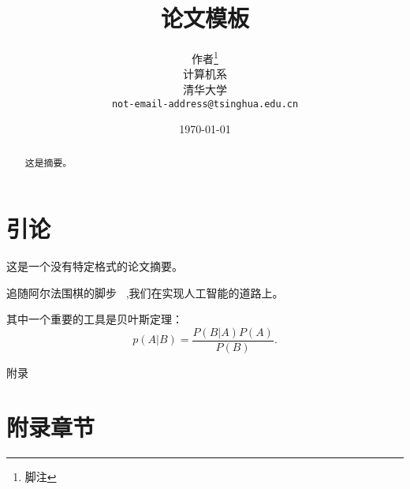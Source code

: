\documentclass[11pt]{article}
\begin{document}
\title{论文模板}
\author{作者\thanks{脚注} \\
  计算机系\\
  清华大学\\
  \texttt{not-email-address@tsinghua.edu.cn} \\
}
\date{\today}
\maketitle
%



\begin{abstract}
这是摘要。
\end{abstract}


\section{引论}
这是一个没有特定格式的论文摘要。

追随阿尔法围棋的脚步 ~\cite{silver2016mastering},我们在实现人工智能的道路上。

其中一个重要的工具是贝叶斯定理：
\begin{equation}
    p(A|B) = \frac{P(B|A)P(A)}{P(B)}.
\end{equation}






\clearpage
{\centering \huge 附录}
\appendix
\section{附录章节}
\end{document}
